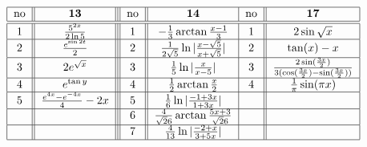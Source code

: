 \[ \begin{tabular}{| c || c || | c | | c |c | | c | }
\hline  no &         ${\bf 13}                                          $    & no    &  ${\bf 14}  $                                                              & no & ${\bf 17}  $       \\    \hline \hline
           $1$   &      $      \frac{5^{2x}}{2\ln 5}                  $        & $1$  &  $ -\frac{1}{3} \arctan\frac{x-1}{3}$                               & $1$ & $2\sin \sqrt x$			  \\ \hline 
           $2$   &      $        \frac{e^{\sin 2t}}{2}                  $       & $2$  &  $\frac{1}{2\sqrt 5 }\ln | \frac{x-\sqrt 5 }{x+\sqrt 5} |  $ & $2$ & $\tan (x) - x$         		\\ \hline
           $3$   &      $2e^{\sqrt x }                              $        & $3$  &  $\frac{1}{5}\ln | \frac{x }{x- 5} |$                                     & $3$ &  $\frac{2\sin(\frac{3x}{2})}{3(\cos(\frac{3x}{2})-\sin(\frac{3x}{2}))}$	\\ \hline  
           $4$   &      $ e^{\tan y}                                   $      &  $4$ &  $\frac{1}{2}\arctan \frac{x}{2}$    	                                & $4$ &	 $\frac{1}{\pi}\sin(\pi x)$					\\ \hline 
           $5$   &      $\frac{e^{4x}-e^{-4x}}{4}-2x               $        &  $5$ &  $\frac{1}{6}\ln|\frac{-1+3x}{1+3x} |$       		    &         &		 \\ \hline
                   &              							   & $6$  &  $\frac{4}{\sqrt 26}\arctan\frac{5x+3}{\sqrt 26} $ &         &       \\ \hline
                   &       			                                      & $7$  &  $\frac{4}{13}\ln|\frac{-2+x}{3+5x} | $                           &          &      \\ \hline
                        
\end{tabular} \]


